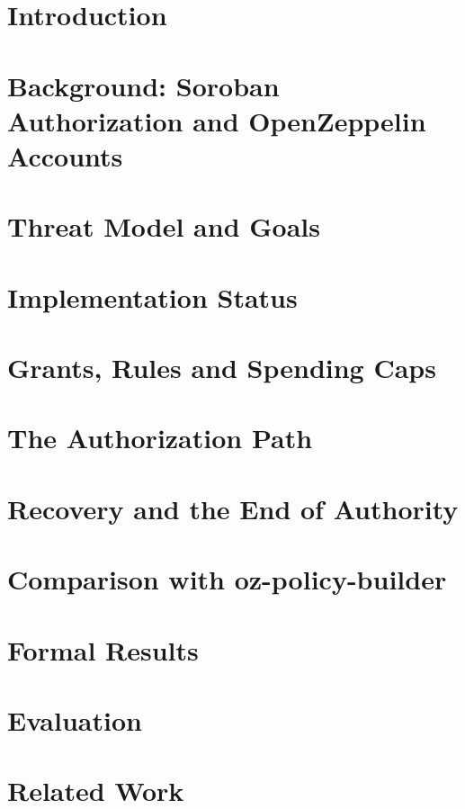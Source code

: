 \section{Introduction}\label{sec:motivation}

\section{Background: Soroban Authorization and OpenZeppelin Accounts}\label{sec:background}

\section{Threat Model and Goals}\label{sec:threat-model}

\section{Implementation Status}\label{sec:status}

\section{Grants, Rules and Spending Caps}\label{sec:grants}

\section{The Authorization Path}\label{sec:authorization}

\section{Recovery and the End of Authority}\label{sec:recovery}

\section{Comparison with oz-policy-builder}\label{sec:compare}

\section{Formal Results}\label{sec:proofs}

\section{Evaluation}\label{sec:evaluation}

\section{Related Work}\label{sec:related}

